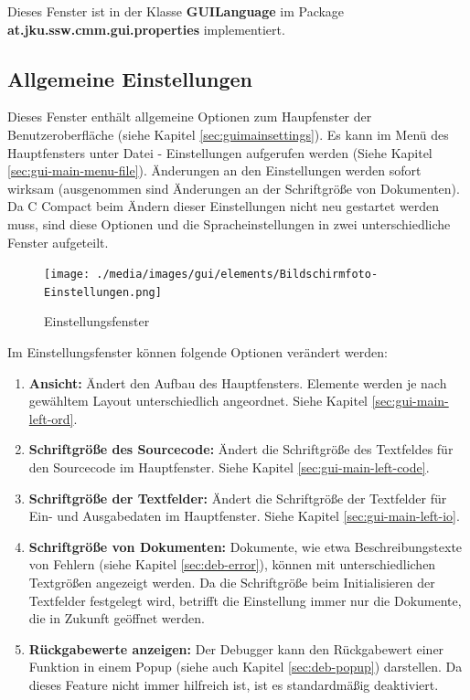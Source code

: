 Dieses Fenster ist in der Klasse \textbf{GUILanguage} im Package \textbf{at.jku.ssw.cmm.gui.properties} implementiert. 

\subsection{Allgemeine Einstellungen}
\label{sec:win-set}
Dieses Fenster enthält allgemeine Optionen zum Haupfenster der Benutzeroberfläche (siehe Kapitel \ref{sec:guimainsettings}). Es kann im Menü des Hauptfensters unter \glqq{}Datei\grqq{} - \glqq{}Einstellungen\grqq{} aufgerufen werden (Siehe Kapitel \ref{sec:gui-main-menu-file}). Änderungen an den Einstellungen werden sofort wirksam (ausgenommen sind Änderungen an der Schriftgröße von Dokumenten). Da C Compact beim Ändern dieser Einstellungen nicht neu gestartet werden muss, sind diese Optionen und die Spracheinstellungen in zwei unterschiedliche Fenster aufgeteilt.

\begin{figure}[htp]
\centering
\texttt{[image: ./media/images/gui/elements/Bildschirmfoto-Einstellungen.png]}
\caption{Einstellungsfenster}
\label{fig:win-set}
\end{figure}

Im Einstellungsfenster können folgende Optionen verändert werden:
\begin{enumerate}
\item \textbf{Ansicht:} Ändert den Aufbau des Hauptfensters. Elemente werden je nach gewähltem Layout unterschiedlich angeordnet. Siehe Kapitel \ref{sec:gui-main-left-ord}.
\item \textbf{Schriftgröße des Sourcecode:} Ändert die Schriftgröße des Textfeldes für den Sourcecode im Hauptfenster. Siehe Kapitel \ref{sec:gui-main-left-code}.
\item \textbf{Schriftgröße der Textfelder:} Ändert die Schriftgröße der Textfelder für Ein- und Ausgabedaten im Hauptfenster. Siehe Kapitel \ref{sec:gui-main-left-io}.
\item \textbf{Schriftgröße von Dokumenten:} Dokumente, wie etwa Beschreibungstexte von Fehlern (siehe Kapitel \ref{sec:deb-error}), können mit unterschiedlichen Textgrößen angezeigt werden. Da die Schriftgröße beim Initialisieren der Textfelder festgelegt wird, betrifft die Einstellung immer nur die Dokumente, die in Zukunft geöffnet werden.
\item \textbf{Rückgabewerte anzeigen:} Der Debugger kann den Rückgabewert einer Funktion in einem Popup (siehe auch Kapitel \ref{sec:deb-popup}) darstellen. Da dieses Feature nicht immer hilfreich ist, ist es standardmäßig deaktiviert.
\end{enumerate}

